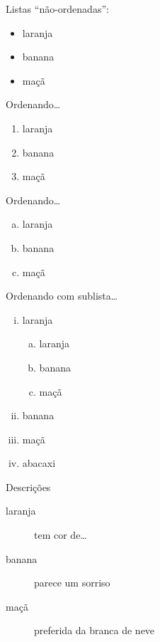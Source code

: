 \documentclass[12pt,article,oneside]{memoir}
\begin{document}
Listas ``não-ordenadas'':
\begin{itemize}
\item laranja
\item banana
\item maçã
\end{itemize}

Ordenando\ldots
\begin{enumerate}
\item laranja
\item banana
\item maçã
\end{enumerate}

Ordenando\ldots
\begin{enumerate}[a.]
\item laranja
\item banana
\item maçã
\end{enumerate}

Ordenando com sublista\ldots
\begin{enumerate}[(i)]
  \item laranja

  \begin{enumerate}[a.]
    \item laranja
    \item banana
    \item maçã
  \end{enumerate}

\item banana
\item maçã
\item abacaxi
\end{enumerate}

Descrições
\begin{description}
\item[laranja] tem cor de\ldots
\item[banana] parece um sorriso
\item[maçã] preferida da branca de neve
\end{description}
\end{document}
